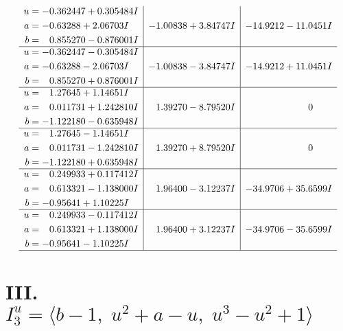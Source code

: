 \documentclass[1p]{elsarticle_modified}
\theoremstyle{definition}
\begin{document}
$$\begin{array}{c|c|c}
\begin{aligned}
u &= -0.362447 + 0.305484 I \\
a &= -0.63288 + 2.06703 I \\
b &= \phantom{-}0.855270 - 0.876001 I\end{aligned}
 & -1.00838 + 3.84747 I & -14.9212 - 11.0451 I \\ \hline\begin{aligned}
u &= -0.362447 - 0.305484 I \\
a &= -0.63288 - 2.06703 I \\
b &= \phantom{-}0.855270 + 0.876001 I\end{aligned}
 & -1.00838 - 3.84747 I & -14.9212 + 11.0451 I \\ \hline\begin{aligned}
u &= \phantom{-}1.27645 + 1.14651 I \\
a &= \phantom{-}0.011731 + 1.242810 I \\
b &= -1.122180 - 0.635948 I\end{aligned}
 & \phantom{-}1.39270 - 8.79520 I & \phantom{-0.000000 } 0 \\ \hline\begin{aligned}
u &= \phantom{-}1.27645 - 1.14651 I \\
a &= \phantom{-}0.011731 - 1.242810 I \\
b &= -1.122180 + 0.635948 I\end{aligned}
 & \phantom{-}1.39270 + 8.79520 I & \phantom{-0.000000 } 0 \\ \hline\begin{aligned}
u &= \phantom{-}0.249933 + 0.117412 I \\
a &= \phantom{-}0.613321 - 1.138000 I \\
b &= -0.95641 + 1.10225 I\end{aligned}
 & \phantom{-}1.96400 - 3.12237 I & -34.9706 + 35.6599 I \\ \hline\begin{aligned}
u &= \phantom{-}0.249933 - 0.117412 I \\
a &= \phantom{-}0.613321 + 1.138000 I \\
b &= -0.95641 - 1.10225 I\end{aligned}
 & \phantom{-}1.96400 + 3.12237 I & -34.9706 - 35.6599 I\\
 \hline 
 \end{array}$$\newpage\newpage\renewcommand{\arraystretch}{1}
\centering \section*{III. $I^u_{3}= \langle b-1,\;u^2+a- u,\;u^3- u^2+1 \rangle$}
\end{document}
